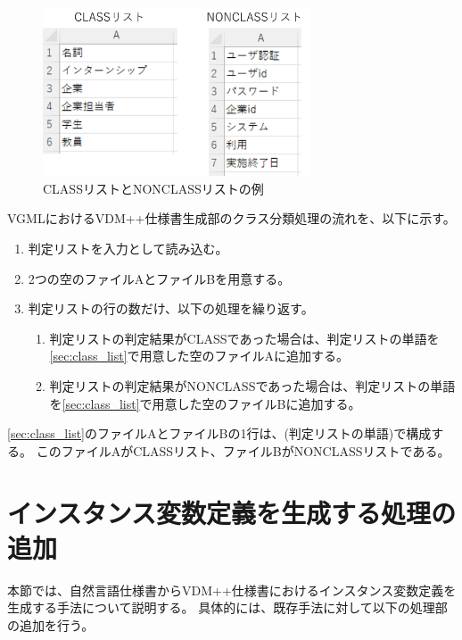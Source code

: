 \begin{figure}[t]
    \begin{center}
        \includegraphics[width=300]{image/class_nonclass_list.png}
        \caption{CLASSリストとNONCLASSリストの例}
        \label{fig:class_nonclass_list}
    \end{center}
\end{figure}

VGMLにおけるVDM++仕様書生成部のクラス分類処理の流れを、以下に示す。

\begin{enumerate}
    \item 判定リストを入力として読み込む。
    \item 2つの空のファイルAとファイルBを用意する。
    \label{sec:class_list}
    \item 判定リストの行の数だけ、以下の処理を繰り返す。
        \begin{enumerate}
            \item 判定リストの判定結果がCLASSであった場合は、判定リストの単語を\ref{sec:class_list}で用意した空のファイルAに追加する。
            \item 判定リストの判定結果がNONCLASSであった場合は、判定リストの単語を\ref{sec:class_list}で用意した空のファイルBに追加する。
        \end{enumerate}
\end{enumerate}

\ref{sec:class_list}のファイルAとファイルBの1行は、(判定リストの単語)で構成する。
このファイルAがCLASSリスト、ファイルBがNONCLASSリストである。

\section{インスタンス変数定義を生成する処理の追加}
\label{sec:instance_generate}
本節では、自然言語仕様書からVDM++仕様書におけるインスタンス変数定義を生成する手法について説明する。
具体的には、既存手法に対して以下の処理部の追加を行う。

